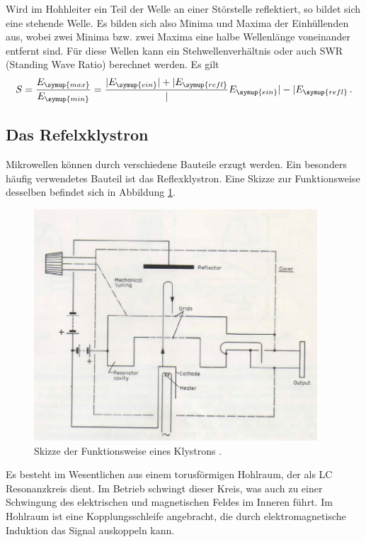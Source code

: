 Wird im Hohhleiter ein Teil der Welle an einer Störstelle reflektiert, so bildet
sich eine stehende Welle. Es bilden sich also Minima und Maxima der Einhüllenden
aus, wobei zwei Minima bzw. zwei Maxima eine halbe Wellenlänge voneinander entfernt
sind. Für diese Wellen kann ein Stehwellenverhältnis oder auch SWR (Standing Wave
Ratio) berechnet werden. Es gilt
\begin{equation}
  S=\frac{E_{\symup{max}}}{E_{\symup{min}}}=\frac{|E_{\symup{ein}}|+|E_{\symup{refl}}}
  |{E_{\symup{ein}}|-|E_{\symup{refl}}}\,.
\end{equation}


\subsection{Das Refelxklystron}
\label{subsec:klystron}
Mikrowellen können durch verschiedene Bauteile erzugt werden. Ein besonders häufig
verwendetes Bauteil ist das Reflexklystron. Eine Skizze zur Funktionsweise desselben
befindet sich in Abbildung \ref{fig:klystron}.

\begin{figure}
  \centering
  \includegraphics[width=300pt]{data/klystron.png}
  \caption{Skizze der Funktionsweise eines Klystrons \cite{Versuchsanleitung_alt}.}
  \label{fig:klystron}
\end{figure}

Es besteht im Wesentlichen aus einem torusförmigen Hohlraum, der als LC Resonanzkreis
dient. Im Betrieb schwingt dieser Kreis, was auch zu einer Schwingung des elektrischen
und magnetischen Feldes im Inneren führt. Im Hohlraum ist eine Kopplungsschleife
angebracht, die durch elektromagnetische Induktion das Signal auskoppeln kann.

